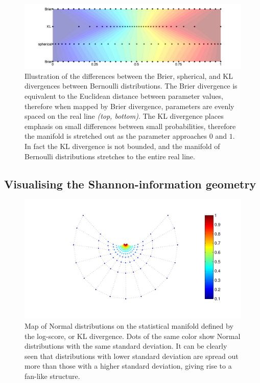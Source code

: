 \begin{figure}
\includegraphics[width=\columnwidth]{figs/embeddings/Bernoulli}
\caption{ Illustration of the differences between the Brier, spherical, and KL divergences between Bernoulli distributions. The Brier divergence is equivalent to the Euclidean distance between parameter values, therefore when mapped by Brier divergence, parameters are evenly spaced on the real line \emph{(top, bottom)}. The KL divergence places emphasis on small differences between  small probabilities, therefore the manifold is stretched out as the parameter approaches $0$ and $1$. In fact the KL divergence is not bounded, and the manifold of Bernoulli distributions stretches to the entire real line. }
\end{figure}

\subsection{Visualising the Shannon-information geometry}

\begin{figure}
	\includegraphics[width=\columnwidth]{figs/embeddings/Normal_KL}
	\caption{Map of Normal distributions on the statistical manifold defined by the log-score, or KL divergence. Dots of the same color show Normal distributions with the same standard deviation. It can be clearly seen that distributions with lower standard deviation are spread out more than those with a higher standard deviation, giving rise to a fan-like structure.}
\end{figure}

